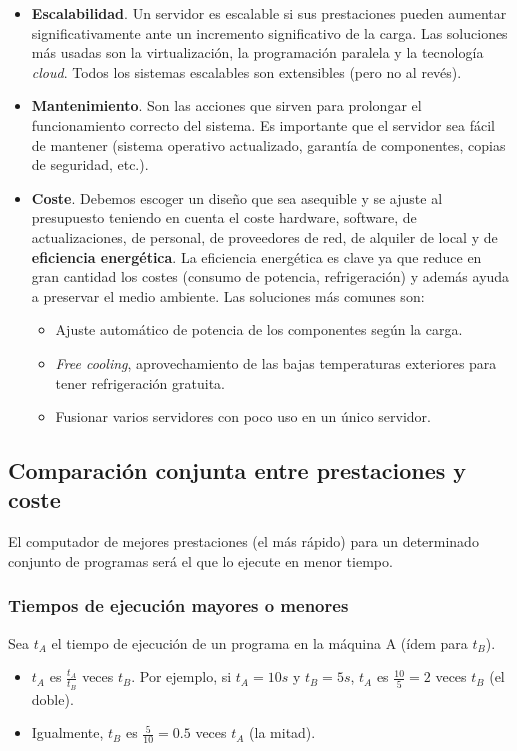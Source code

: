 \documentclass[12pt,spanish]{article}
\begin{document}
\begin{itemize}
	\item \textbf{Escalabilidad}. Un servidor es escalable si sus prestaciones pueden aumentar significativamente ante un incremento significativo de la carga. Las soluciones más usadas son la virtualización, la programación paralela y la tecnología \textit{cloud}. Todos los sistemas escalables son extensibles (pero no al revés).
	\item \textbf{Mantenimiento}. Son las acciones que sirven para prolongar el funcionamiento correcto del sistema. Es importante que el servidor sea fácil de mantener (sistema operativo actualizado, garantía de componentes, copias de seguridad, etc.).
	\item \textbf{Coste}. Debemos escoger un diseño que sea asequible y se ajuste al presupuesto teniendo en cuenta el coste hardware, software, de actualizaciones, de personal, de proveedores de red, de alquiler de local y de \textbf{eficiencia energética}. La eficiencia energética es clave ya que reduce en gran cantidad los costes (consumo de potencia, refrigeración) y además ayuda a preservar el medio ambiente. Las soluciones más comunes son:
	\begin{itemize}
		\item Ajuste automático de potencia de los componentes según la carga.
		\item \textit{Free cooling}, aprovechamiento de las bajas temperaturas exteriores para tener refrigeración gratuita.
		\item Fusionar varios servidores con poco uso en un único servidor.
	\end{itemize}

\end{itemize}

\subsection{Comparación conjunta entre prestaciones y coste}

El computador de mejores prestaciones (el más rápido) para un determinado conjunto de programas será el que lo ejecute en menor tiempo.\\

\subsubsection{Tiempos de ejecución mayores o menores}

Sea $t_A$ el tiempo de ejecución de un programa en la máquina A (ídem para $t_B$).
\begin{itemize}
	\item $t_A$ es $\frac{t_A}{t_B}$ veces $t_B$. Por ejemplo, si $t_A=10s$ y $t_B=5s$, $t_A$ es $\frac{10}{5}=2$ veces $t_B$ (el doble).
	\item Igualmente, $t_B$ es $\frac{5}{10}=0.5$ veces $t_A$ (la mitad).
\end{itemize}
\end{document}
